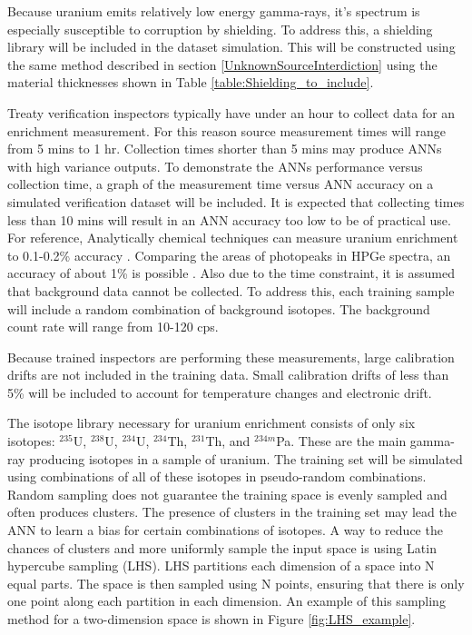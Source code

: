 \documentclass[tocnosub,noragright,centerchapter,12pt,fullpage]{uiucecethesis09}
\begin{document}
Because uranium emits relatively low energy gamma-rays, it's spectrum is especially susceptible to corruption by shielding. To address this, a shielding library will be included in the dataset simulation. This will be constructed using the same method described in section \ref{UnknownSourceInterdiction} using the material thicknesses shown in Table \ref{table:Shielding_to_include}.

Treaty verification inspectors typically have under an hour to collect data for an enrichment measurement. For this reason source measurement times will range from 5 mins to 1 hr. Collection times shorter than 5 mins may produce ANNs with high variance outputs. To demonstrate the ANNs performance versus collection time, a graph of the measurement time versus ANN accuracy on a simulated verification dataset will be included. It is expected that collecting times less than 10 mins will result in an ANN accuracy too low to be of practical use. For reference, Analytically chemical techniques can measure uranium enrichment to 0.1-0.2\% accuracy \cite{Pandas_Ch7_1991}. Comparing the areas of photopeaks in HPGe spectra, an accuracy of about 1\% is possible \cite{Pandas_Ch7_1991}. Also due to the time constraint, it is assumed that background data cannot be collected. To address this, each training sample will include a random combination of background isotopes. The background count rate will range from 10-120 cps.


Because trained inspectors are performing these measurements, large calibration drifts are not included in the training data. Small calibration drifts of less than 5\% will be included to account for temperature changes and electronic drift.

The isotope library necessary for uranium enrichment consists of only six isotopes: $^{235}$U, $^{238}$U, $^{234}$U, $^{234}$Th, $^{231}$Th, and $^{234m}$Pa. These are the main gamma-ray producing isotopes in a sample of uranium. The training set will be simulated using combinations of all of these isotopes in pseudo-random combinations. Random sampling does not guarantee the training space is evenly sampled and often produces clusters. The presence of clusters in the training set may lead the ANN to learn a bias for certain combinations of isotopes. A way to reduce the chances of clusters and more uniformly sample the input space is using Latin hypercube sampling (LHS). LHS partitions each dimension of a space into N equal parts. The space is then sampled using N points, ensuring that there is only one point along each partition in each dimension. An example of this sampling method for a two-dimension space is shown in Figure \ref{fig:LHS_example}.
\end{document}
